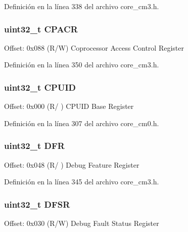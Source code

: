 Definición en la línea 338 del archivo core\+\_\+cm3.\+h.

\subsubsection[{\texorpdfstring{C\+P\+A\+CR}{CPACR}}]{ uint32\+\_\+t C\+P\+A\+CR}\hypertarget{struct_s_c_b___type_acccaf5688449c8253e9952ddc2161528}{}\label{struct_s_c_b___type_acccaf5688449c8253e9952ddc2161528}
Offset\+: 0x088 (R/W) Coprocessor Access Control Register 

Definición en la línea 350 del archivo core\+\_\+cm3.\+h.

\subsubsection[{\texorpdfstring{C\+P\+U\+ID}{CPUID}}]{ uint32\+\_\+t C\+P\+U\+ID}\hypertarget{struct_s_c_b___type_a30abfea43143a424074f682bd61eace0}{}\label{struct_s_c_b___type_a30abfea43143a424074f682bd61eace0}
Offset\+: 0x000 (R/ ) C\+P\+U\+ID Base Register 

Definición en la línea 307 del archivo core\+\_\+cm0.\+h.

\subsubsection[{\texorpdfstring{D\+FR}{DFR}}]{ uint32\+\_\+t D\+FR}\hypertarget{struct_s_c_b___type_a1b9a71780ae327f1f337a2176b777618}{}\label{struct_s_c_b___type_a1b9a71780ae327f1f337a2176b777618}
Offset\+: 0x048 (R/ ) Debug Feature Register 

Definición en la línea 345 del archivo core\+\_\+cm3.\+h.

\subsubsection[{\texorpdfstring{D\+F\+SR}{DFSR}}]{ uint32\+\_\+t D\+F\+SR}\hypertarget{struct_s_c_b___type_a415598d9009bb3ffe9f35e03e5a386fe}{}\label{struct_s_c_b___type_a415598d9009bb3ffe9f35e03e5a386fe}
Offset\+: 0x030 (R/W) Debug Fault Status Register 


